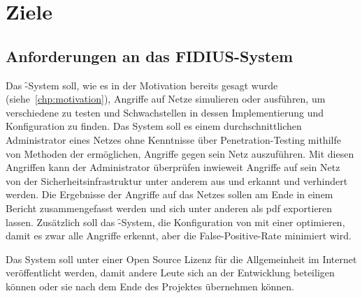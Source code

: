 \chapter{Ziele}
\label{chp:objectives}

\section{Anforderungen an das FIDIUS-System}
\label{chp:objectives-functions}

\authors{\HM}{\LM \and \BK \and \JF \and \DE \and \MW}

Das \f-System soll, wie es in der Motivation bereits gesagt wurde
(siehe~\ref{chp:motivation}), Angriffe auf Netze simulieren oder
ausführen, um verschiedene  zu testen und Schwachstellen
in dessen Implementierung und Konfiguration zu finden. Das System soll
es einem durchschnittlichen Administrator eines Netzes ohne Kenntnisse
über Penetration-Testing mithilfe von Methoden der 
ermöglichen, Angriffe gegen sein Netz auszuführen.
Mit diesen Angriffen kann der Administrator überprüfen inwieweit Angriffe
auf sein Netz von der
Sicherheitsinfrastruktur unter anderem aus  und
 erkannt und verhindert werden.
Die Ergebnisse der Angriffe auf das Netzes sollen am Ende in einem Bericht
zusammengefasst werden und sich unter anderen als pdf exportieren lassen.
 Zusätzlich soll das
\f-System, die Konfiguration von  mit einer  optimieren,
damit es zwar alle Angriffe erkennt, aber die False-Positive-Rate
minimiert wird.

Das System soll unter einer Open Source Lizenz für die Allgemeinheit im
Internet veröffentlicht werden, damit andere Leute sich an der Entwicklung
beteiligen können oder sie nach dem Ende des Projektes übernehmen können.

